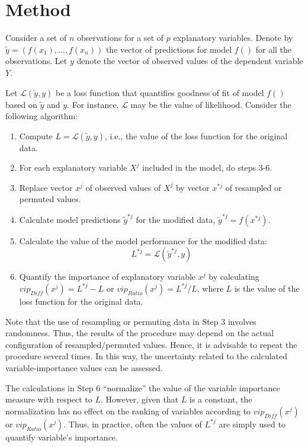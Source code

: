 \documentclass[]{krantz}
\providecommand{\tightlist}{%
  \setlength{\itemsep}{0pt}\setlength{\parskip}{0pt}}
\begin{document}
\hypertarget{featureImportanceMethod}{%
\section{Method}\label{featureImportanceMethod}}

Consider a set of \(n\) observations for a set of \(p\) explanatory variables. Denote by \(\widetilde{y}=(f(x_1),\ldots,f(x_n))\) the vector of predictions for model \(f()\) for all the observations. Let \(y\) denote the vector of observed values of the dependent variable \(Y\).

Let \(\mathcal L(\widetilde{y}, y)\) be a loss function that quantifies goodness of fit of model \(f()\) based on \(\widetilde{y}\) and \(y\). For instance, \(\mathcal L\) may be the value of likelihood. Consider the following algorithm:

\begin{enumerate}
\def\labelenumi{\arabic{enumi}.}
\tightlist
\item
  Compute \(L = \mathcal L(\widetilde{y}, y)\), i.e., the value of the loss function for the original data.
\item
  For each explanatory variable \(X^j\) included in the model, do steps 3-6.
\item
  Replace vector \(x^j\) of observed values of \(X^j\) by vector \(x^{*j}\) of resampled or permuted values.
\item
  Calculate model predictions \(\widetilde{y}^{*j}\) for the modified data, \(\widetilde{y}^{*j} = f(x^{*j})\).
\item
  Calculate the value of the model performance for the modified data:
  \[
  L^{*j} = \mathcal L(\widetilde{y}^{*j}, y)
  \]
\item
  Quantify the importance of explanatory variable \(x^j\) by calculating \(vip_{Diff}(x^j) = L^{*j} - L\) or \(vip_{Ratio}(x^j) = L^{*j} / L\), where \(L\) is the value of the loss function for the original data.
\end{enumerate}

Note that the use of resampling or permuting data in Step 3 involves randomness. Thus, the results of the procedure may depend on the actual configuration of resampled/permuted values. Hence, it is advisable to repeat the procedure several times. In this way, the uncertainty related to the calculated variable-importance values can be assessed.

The calculations in Step 6 ``normalize'' the value of the variable importance measure with respect to \(L\). However, given that \(L\) is a constant, the normalization has no effect on the ranking of variables according to \(vip_{Diff}(x^j)\) or \(vip_{Ratio}(x^j)\). Thus, in practice, often the values of \(L^{*j}\) are simply used to quantify variable's importance.
\end{document}
